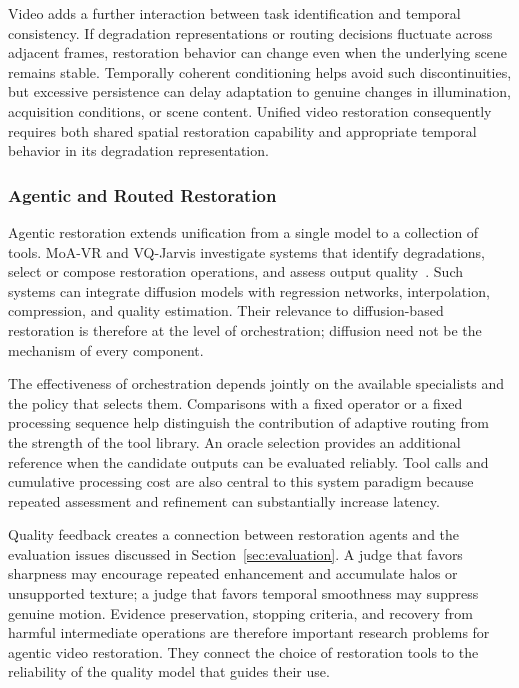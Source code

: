 Video adds a further interaction between task identification and temporal consistency. If degradation representations or routing decisions fluctuate across adjacent frames, restoration behavior can change even when the underlying scene remains stable. Temporally coherent conditioning helps avoid such discontinuities, but excessive persistence can delay adaptation to genuine changes in illumination, acquisition conditions, or scene content. Unified video restoration consequently requires both shared spatial restoration capability and appropriate temporal behavior in its degradation representation.

\subsubsection{Agentic and Routed Restoration}
Agentic restoration extends unification from a single model to a collection of tools. MoA-VR and VQ-Jarvis investigate systems that identify degradations, select or compose restoration operations, and assess output quality~\cite{moavr,vqjarvis}. Such systems can integrate diffusion models with regression networks, interpolation, compression, and quality estimation. Their relevance to diffusion-based restoration is therefore at the level of orchestration; diffusion need not be the mechanism of every component.

The effectiveness of orchestration depends jointly on the available specialists and the policy that selects them. Comparisons with a fixed operator or a fixed processing sequence help distinguish the contribution of adaptive routing from the strength of the tool library. An oracle selection provides an additional reference when the candidate outputs can be evaluated reliably. Tool calls and cumulative processing cost are also central to this system paradigm because repeated assessment and refinement can substantially increase latency.

Quality feedback creates a connection between restoration agents and the evaluation issues discussed in Section~\ref{sec:evaluation}. A judge that favors sharpness may encourage repeated enhancement and accumulate halos or unsupported texture; a judge that favors temporal smoothness may suppress genuine motion. Evidence preservation, stopping criteria, and recovery from harmful intermediate operations are therefore important research problems for agentic video restoration. They connect the choice of restoration tools to the reliability of the quality model that guides their use.
